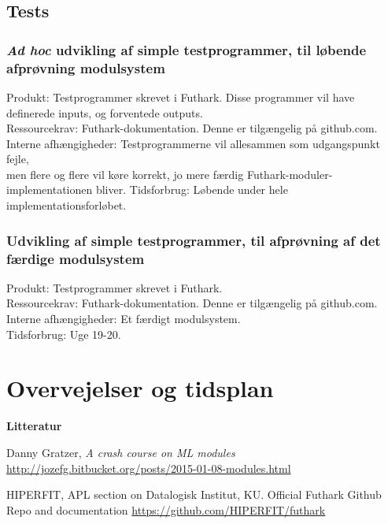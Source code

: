 \documentclass[12pt]{article}
\begin{document}
\subsection{Tests}
\subsubsection{\textit{Ad hoc} udvikling af simple testprogrammer, til løbende afprøvning 
modulsystem}
Produkt: Testprogrammer skrevet i Futhark. Disse programmer vil have definerede
inputs, og forventede outputs.\\
Ressourcekrav: Futhark-dokumentation. Denne er tilgængelig på github.com\cite{futhark-repo}. \\
Interne afhængigheder: Testprogrammerne vil allesammen som udgangspunkt fejle, \\
men flere og flere vil køre korrekt, jo mere færdig Futhark-moduler-implementationen bliver.
Tidsforbrug: Løbende under hele implementationsforløbet. \\

\subsubsection{Udvikling af simple testprogrammer, til afprøvning 
af det færdige modulsystem}
Produkt: Testprogrammer skrevet i Futhark. \\
Ressourcekrav: Futhark-dokumentation. Denne er tilgængelig på github.com\cite{futhark-repo}. \\
Interne afhængigheder: Et færdigt modulsystem. \\
Tidsforbrug: Uge 19-20. \\

\section{Overvejelser og tidsplan}
\textbf{Litteratur}
\begin{thebibliography}

Danny Gratzer, \textit{A crash course on ML modules}
\url{http://jozefg.bitbucket.org/posts/2015-01-08-modules.html}

HIPERFIT, APL section on Datalogisk Institut, KU.
Official Futhark Github Repo and documentation
\url{https://github.com/HIPERFIT/futhark}
\end{thebibliography}
\end{document}
